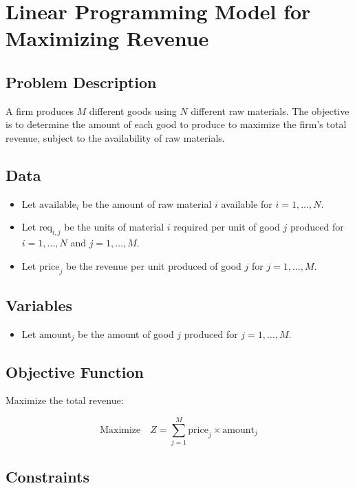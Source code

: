 \documentclass{article}
\begin{document}
\section*{Linear Programming Model for Maximizing Revenue}

\subsection*{Problem Description}

A firm produces \( M \) different goods using \( N \) different raw materials. The objective is to determine the amount of each good to produce to maximize the firm's total revenue, subject to the availability of raw materials.

\subsection*{Data}

\begin{itemize}
    \item Let \( \text{available}_i \) be the amount of raw material \( i \) available for \( i = 1, \ldots, N \).
    \item Let \( \text{req}_{i,j} \) be the units of material \( i \) required per unit of good \( j \) produced for \( i = 1, \ldots, N \) and \( j = 1, \ldots, M \).
    \item Let \( \text{price}_j \) be the revenue per unit produced of good \( j \) for \( j = 1, \ldots, M \).
\end{itemize}

\subsection*{Variables}

\begin{itemize}
    \item Let \( \text{amount}_j \) be the amount of good \( j \) produced for \( j = 1, \ldots, M \).
\end{itemize}

\subsection*{Objective Function}

Maximize the total revenue:

\[
\text{Maximize} \quad Z = \sum_{j=1}^{M} \text{price}_j \times \text{amount}_j
\]

\subsection*{Constraints}
\end{document}

